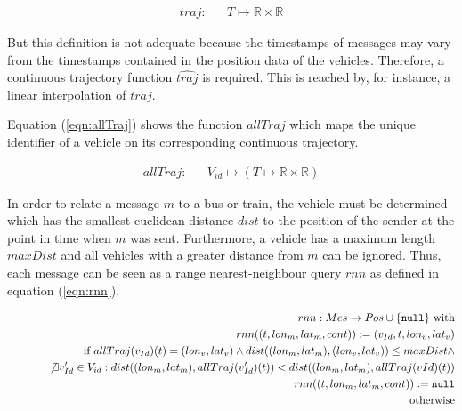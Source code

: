 \vspace*{-2\baselineskip}
\begin{eqnarray}
 traj: & & T \mapsto \mathbb{R} \times \mathbb{R}\label{eqn:traj}
\end{eqnarray}

But this definition is not adequate because the timestamps of messages may vary from the timestamps contained in the position data of the vehicles. Therefore, a continuous trajectory function $\widehat{traj}$ is required. This is reached by, for instance, a linear interpolation of $traj$.

Equation (\ref{eqn:allTraj}) shows the function $allTraj$ which maps the unique identifier of a vehicle on its corresponding continuous trajectory.

\vspace*{-2\baselineskip}
\begin{eqnarray}
 allTraj: & & V_{id} \mapsto (T \mapsto \mathbb{R} \times \mathbb{R})\label{eqn:allTraj}
\end{eqnarray}

In order to relate a message $m$ to a bus or train, the vehicle must be determined which has the smallest euclidean distance $dist$ to the position of the sender at the point in time when $m$ was sent. Furthermore, a vehicle has a maximum length $maxDist$ and all vehicles with a greater distance from $m$ can be ignored. Thus, each message can be seen as a range nearest-neighbour query $rnn$ as defined in equation (\ref{eqn:rnn}).

\vspace*{-2\baselineskip}
\begin{eqnarray}
 &&rnn: Mes \rightarrow Pos \cup \{\texttt{null}\} \textrm{ with}\label{eqn:rnn}\\
 &&rnn((t,lon_m,lat_m,cont)):= (v_{Id},t,lon_v,lat_v)\nonumber\\
 &&\hspace*{1cm}\textrm{if } allTraj(v_{Id})(t)=(lon_v,lat_v) \wedge dist((lon_m,lat_m),(lon_v,lat_v))\leq maxDist \wedge \nonumber\\
 &&\hspace*{1cm}\not\exists v_{Id}' \in V_{id}: dist((lon_m,lat_m),allTraj(v_{Id}')(t))< dist((lon_m,lat_m),allTraj(vId)(t))\nonumber\\
 &&rnn((t,lon_m,lat_m,cont)):= \texttt{null}\nonumber\\
 &&\hspace*{1cm}\textrm{otherwise}\nonumber
\end{eqnarray}


